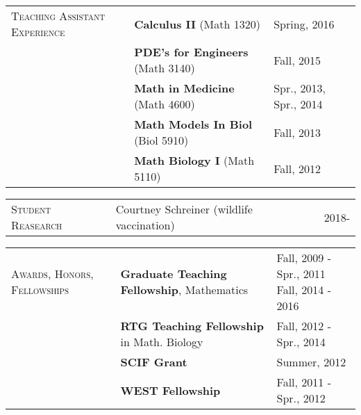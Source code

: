 \documentclass[11pt]{article}
\newcommand{\cellone}{2.5cm}
\newcommand{\celltwo}{12cm}
\newcommand{\cellthree}{4cm}
\newcommand{\spa}{\vspace{.4in}}
\begin{document}
\spa

\begin{tabularx}{\textwidth}{p{\cellone} p{\celltwo} p{\cellthree}}
  
  \parbox[t][0cm]{\cellone}{T\textsc{eaching} A\textsc{ssistant} E\textsc{xperience}} & \parbox[t][0cm]{\celltwo}{{\bf  Calculus II} (Math 1320)}  &  \parbox[t][]{\cellthree}{Spring, 2016}\\ 
  
  
  & \parbox[t][0cm]{\celltwo}{{\bf  PDE's for Engineers} (Math 3140)}  &  \parbox[t][]{\cellthree}{Fall, 2015}\\ 
  
  &  \parbox[t][0cm]{\celltwo}{{\bf  Math in Medicine} (Math 4600)}  &  \parbox[t][]{\cellthree}{Spr., 2013, Spr., 2014}\\  
  &  \parbox[t][0cm]{\celltwo}{{\bf  Math Models In Biol} (Biol 5910)}  &  \parbox[t][]{\cellthree}{Fall, 2013} \\ 					          
  &  \parbox[t][1cm]{\celltwo}{{\bf  Math Biology I} (Math 5110)}  &  Fall, 2012 \\ 
\end{tabularx}

\spa

\begin{tabularx}{\textwidth}{p{\cellone} p{\celltwo} p{\cellthree}}
  \parbox[t][0cm]{\cellone}{S\textsc{tudent} R\textsc{easearch}} & \parbox[t][]{\celltwo}{Courtney Schreiner (wildlife vaccination)} & \parbox[t][0cm]{\cellthree}{2018-} 

\end{tabularx}

\spa

\begin{tabularx}{\textwidth}{p{\cellone} p{\celltwo} p{\cellthree}}
\parbox[t][0cm]{\cellone}{A\textsc{wards}, H\textsc{onors}, F\textsc{ellowships}} & \parbox[t][0cm]{\celltwo}{{\bf Graduate Teaching Fellowship}, Mathematics} & \parbox[t][]{\cellthree}{Fall, 2009 - Spr., 2011 \\ Fall, 2014 - 2016} \\ 
												        & \parbox[t][0cm]{\celltwo}{{\bf RTG Teaching Fellowship} in Math. Biology} & \parbox[t][]{\cellthree}{Fall, 2012 - Spr., 2014} \\
												        &  \parbox[t][0cm]{\celltwo}{{\bf SCIF Grant}}  &  Summer, 2012 \\ 	
												        &  \parbox[t][0cm]{\celltwo}{{\bf WEST Fellowship}}  &  Fall, 2011 - Spr., 2012 \\ 
\end{tabularx}
\end{document}
